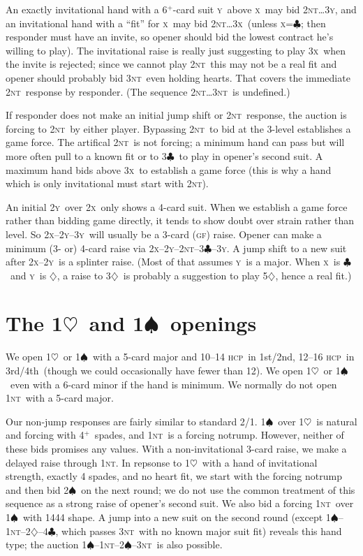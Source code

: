 \documentclass{report}
\newcommand{\fs}{1st/2nd}
\newcommand{\tf}{3rd/4th}
\newcommand{\hcp}{\textsc{hcp}}
\newcommand{\gf}{\textsc{gf}}
\renewcommand{\c}{\ensuremath{\clubsuit}}
\renewcommand{\d}{\ensuremath{\diamondsuit}}
\newcommand{\h}{\ensuremath{\heartsuit}}
\newcommand{\s}{\ensuremath{\spadesuit}}
\newcommand{\nt}{\textsc{nt}}
\newcommand{\x}{\textsc{x}}
\newcommand{\y}{\textsc{y}}
\newcommand{\+}{\ensuremath{^+}}
\begin{document}
An exactly invitational hand with a 6\+-card suit \y\ above \x\ may
bid 2\nt\dots3\y, and an invitational hand with a ``fit'' for \x\ may
bid 2\nt\dots3\x\ (unless \x=\c; then responder must have an invite,
so opener should bid the lowest contract he's willing to play).  The
invitational raise is really just suggesting to play 3\x\ when the
invite is rejected; since we cannot play 2\nt\ this may not be a real
fit and opener should probably bid 3\nt\ even holding hearts.  That
covers the immediate 2\nt\ response by responder.  (The sequence
2\nt\dots3\nt\ is undefined.)

If responder does not make an initial jump shift or 2\nt\ response,
the auction is forcing to 2\nt\ by either player.  Bypassing 2\nt\ to
bid at the 3-level establishes a game force.  The artifical 2\nt\ is
not forcing; a minimum hand can pass but will more often pull to a
known fit or to 3\c\ to play in opener's second suit.  A maximum hand
bids above 3\x\ to establish a game force (this is why a hand which is
only invitational must start with 2\nt).

An initial 2\y\ over 2\x\ only shows a 4-card suit.  When we establish
a game force rather than bidding game directly, it tends to show doubt
over strain rather than level.  So 2\x--2\y--3\y\ will usually be a
3-card (\gf) raise.  Opener can make a minimum (3- or) 4-card raise
via 2\x--2\y--2\nt--3\c--3\y.  A jump shift to a new suit after
2\x--2\y\ is a splinter raise.  (Most of that assumes \y\ is a major.
When \x\ is \c\ and \y\ is \d, a raise to 3\d\ is probably a
suggestion to play 5\d, hence a real fit.)

\chapter{The 1\h\ and 1\s\ openings}

We open 1\h\ or 1\s\ with a 5-card major and 10--14 \hcp\ in \fs,
12--16 \hcp\ in \tf\ (though we could occasionally have fewer than
12).  We open 1\h\ or 1\s\ even with a 6-card minor if the hand is
minimum.  We normally do not open 1\nt\ with a 5-card major.

Our non-jump responses are fairly similar to standard 2/1.  1\s\ over
1\h\ is natural and forcing with 4\+\ spades, and 1\nt\ is a forcing
notrump.  However, neither of these bids promises any values.  With a
non-invitational 3-card raise, we make a delayed raise through 1\nt.
In repsonse to 1\h\ with a hand of invitational strength, exactly 4
spades, and no heart fit, we start with the forcing notrump and then
bid 2\s\ on the next round; we do not use the common treatment of this
sequence as a strong raise of opener's second suit.  We also bid a
forcing 1\nt\ over 1\s\ with 1444 shape.  A jump into a new suit on
the second round (except 1\s--1\nt--2\d--4\c, which passes 3\nt\ with
no known major suit fit) reveals this hand type; the auction
1\s--1\nt--2\s--3\nt\ is also possible.
\end{document}
